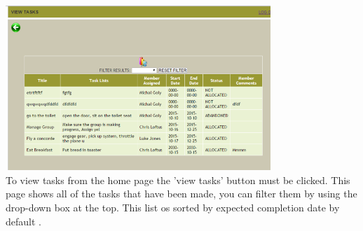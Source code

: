 \documentclass{project}
\begin{document}
\newline
\includegraphics[width=0.75\textwidth, center]{images/5.2/TaskerMANViewTask} \\
To view tasks from the home page the 'view tasks' button must be clicked. This page shows all of the tasks that have been made, you can filter them by using the drop-down box at the top. This list os sorted by expected completion date by default \cite{se.qa.rs fr7}.
\end{document}
